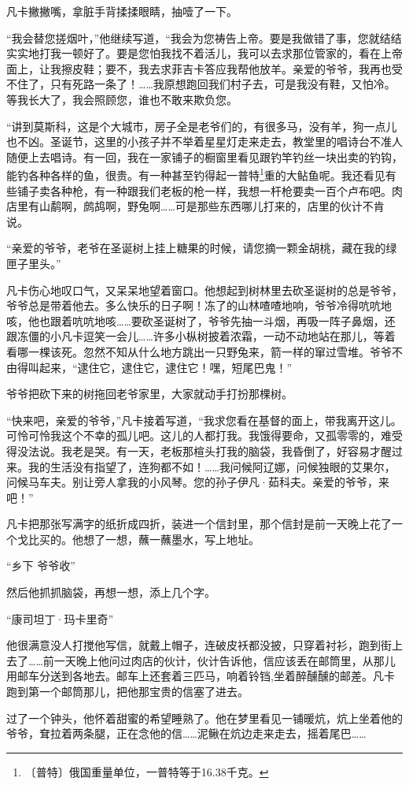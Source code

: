 \documentclass[12pt,UTF-8,openany]{ctexbook}
\begin{document}
\begin{Large}
    凡卡撇撇嘴，拿脏手背揉揉眼睛，抽噎了一下。
    
    “我会替您搓烟叶，”他继续写道，“我会为您祷告上帝。要是我做错了事，您就结结实实地打我一顿好了。要是您怕我找不着活儿，我可以去求那位管家的，看在上帝面上，让我擦皮鞋；要不，我去求菲吉卡答应我帮他放羊。亲爱的爷爷，我再也受不住了，只有死路一条了！……我原想跑回我们村子去，可是我没有鞋，又怕冷。等我长大了，我会照顾您，谁也不敢来欺负您。
    
    “讲到莫斯科，这是个大城市，房子全是老爷们的，有很多马，没有羊，狗一点儿也不凶。圣诞节，这里的小孩子并不举着星星灯走来走去，教堂里的唱诗台不准人随便上去唱诗。有一回，我在一家铺子的橱窗里看见跟钓竿钓丝一块出卖的钓钩，能钓各种各样的鱼，很贵。有一种甚至钓得起一普特\footnote{〔普特〕俄国重量单位，一普特等于16.38千克。}重的大鲇鱼呢。我还看见有些铺子卖各种枪，有一种跟我们老板的枪一样，我想一杆枪要卖一百个卢布吧。肉店里有山鹬啊，鹧鸪啊，野兔啊……可是那些东西哪儿打来的，店里的伙计不肯说。
    
    “亲爱的爷爷，老爷在圣诞树上挂上糖果的时候，请您摘一颗金胡桃，藏在我的绿匣子里头。”
    
    凡卡伤心地叹口气，又呆呆地望着窗口。他想起到树林里去砍圣诞树的总是爷爷，爷爷总是带着他去。多么快乐的日子啊！冻了的山林喳喳地响，爷爷冷得吭吭地咳，他也跟着吭吭地咳……要砍圣诞树了，爷爷先抽一斗烟，再吸一阵子鼻烟，还跟冻僵的小凡卡逗笑一会儿……许多小枞树披着浓霜，一动不动地站在那儿，等着看哪一棵该死。忽然不知从什么地方跳出一只野兔来，箭一样的窜过雪堆。爷爷不由得叫起来，“逮住它，逮住它，逮住它！嘿，短尾巴鬼！”
    
    爷爷把砍下来的树拖回老爷家里，大家就动手打扮那棵树。
    
    “快来吧，亲爱的爷爷，”凡卡接着写道，“我求您看在基督的面上，带我离开这儿。可怜可怜我这个不幸的孤儿吧。这儿的人都打我。我饿得要命，又孤零零的，难受得没法说。我老是哭。有一天，老板那楦头打我的脑袋，我昏倒了，好容易才醒过来。我的生活没有指望了，连狗都不如！……我问候阿辽娜，问候独眼的艾果尔，问候马车夫。别让旁人拿我的小风琴。您的孙子伊凡·茹科夫。亲爱的爷爷，来吧！”
    
    凡卡把那张写满字的纸折成四折，装进一个信封里，那个信封是前一天晚上花了一个戈比买的。他想了一想，蘸一蘸墨水，写上地址。
    
    “乡下 爷爷收”
    
    然后他抓抓脑袋，再想一想，添上几个字。
    
    “康司坦丁·玛卡里奇”
    
    他很满意没人打搅他写信，就戴上帽子，连破皮袄都没披，只穿着衬衫，跑到街上去了……前一天晚上他问过肉店的伙计，伙计告诉他，信应该丢在邮筒里，从那儿用邮车分送到各地去。邮车上还套着三匹马，响着铃铛,坐着醉醺醺的邮差。凡卡跑到第一个邮筒那儿，把他那宝贵的信塞了进去。
    
    过了一个钟头，他怀着甜蜜的希望睡熟了。他在梦里看见一铺暖炕，炕上坐着他的爷爷，耷拉着两条腿，正在念他的信……泥鳅在炕边走来走去，摇着尾巴……
    
\end{Large}
\end{document}
